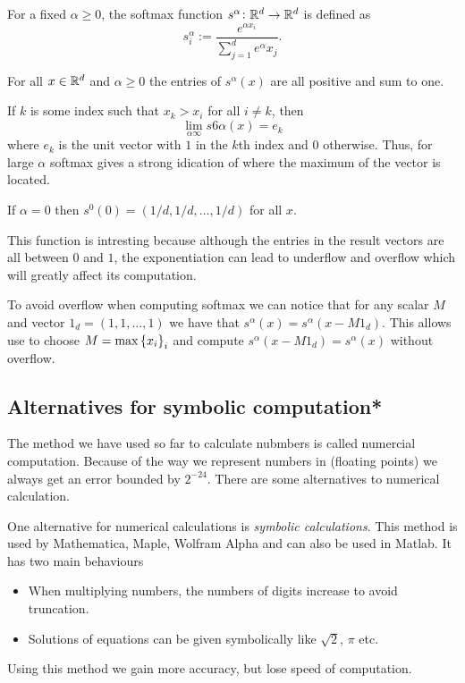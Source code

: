 \documentclass[11pt,a4paper]{article}
\begin{document}
\begin{definition}
  For a fixed $\alpha \geq 0$, the softmax function 
  $s^{\alpha} \colon \mathbb{R}^d \to \mathbb{R}^d$ is defined as
  \[
    s^{\alpha}_i := \frac{e^{\alpha x_i}}{\sum_{j=1}^{d} e^{\alpha} x_j}.
  \]
\end{definition}
\begin{remark}
  For all $x \in \mathbb{R}^d$ and $\alpha \geq 0$ the entries of $s^{\alpha}(x)$
  are all positive and sum to one.
\end{remark}
\begin{remark}
  If $k$ is some index such that $x_k > x_i$ for all $i \neq k$, then
  \[
    \lim_{\alpha \infty} s6{\alpha}(x) = e_k
  \]
  where $e_k$ is the unit vector with $1$ in the $k$th index and $0$ otherwise.
  Thus, for large $\alpha$ softmax gives a strong idication of where the
  maximum of the vector is located.
\end{remark}
\begin{remark}
  If $\alpha = 0$ then $s^0(0) = (1/d, 1/d, \dots, 1/d)$ for all $x$.
\end{remark}

This function is intresting because although the entries in the result vectors
are all between $0$ and $1$, the exponentiation can lead to underflow and
overflow which will greatly affect its computation.

To avoid overflow when computing softmax we can notice that for any scalar
$M$ and vector $1_d = (1, 1, \dots, 1)$ we have that 
$s^{\alpha}(x) = s^{\alpha}(x - M 1_d)$.
This allows use to choose $M = \max\set{x_i}_i$ and compute
$s^{\alpha}(x - M 1_d) = s^{\alpha}(x)$ without overflow.

\subsection{Alternatives for symbolic computation*}

The method we have used so far to calculate nubmbers is called numercial
computation.
Because of the way we represent numbers in (floating points) we always
get an error bounded by $2^{-24}$.
There are some alternatives to numerical calculation.

One alternative for numerical calculations is \emph{symbolic calculations}.
This method is used by Mathematica, Maple, Wolfram Alpha 
and can also be used in Matlab.
It has two main behaviours
\begin{itemize}
  \item When multiplying numbers, the numbers of digits increase to avoid
    truncation.
  \item Solutions of equations can be given symbolically like $\sqrt{2}$,
    $\pi$ etc.
\end{itemize}
Using this method we gain more accuracy, but lose speed of computation.
\end{document}
